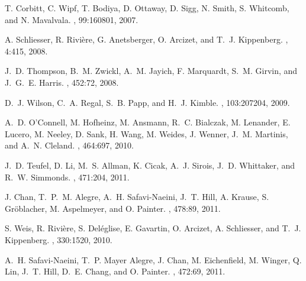 \begin{thebibliography}{1}
T. Corbitt,
C. Wipf,
T. Bodiya,
D. Ottaway,
D. Sigg,
N. Smith,
S. Whitcomb,
and N. Mavalvala.
 ,
99:160801, 2007.

A. Schliesser,
R. Rivi\`{e}re,
G. Anetsberger,
O. Arcizet,
and T.~J. Kippenberg.
,
4:415, 2008.

J.~D. Thompson,
B.~M. Zwickl,
A.~M. Jayich,
F. Marquardt,
S.~M. Girvin,
and J.~G.~E. Harris.
 ,
452:72, 2008.

D.~J. Wilson,
C.~A. Regal,
S.~B. Papp,
and H.~J. Kimble.
,
103:207204, 2009.

A.~D. O'Connell,
M. Hofheinz,
M. Ansmann,
R.~C. Bialczak,
M. Lenander,
E. Lucero,
M. Neeley,
D. Sank,
H. Wang,
M. Weides,
J. Wenner,
J.~M. Martinis,
and A.~N. Cleland.
,
464:697, 2010.

J.~D. Teufel,
D. Li,
M.~S. Allman,
K. Cicak,
A.~J. Sirois,
J.~D. Whittaker,
and R.~W. Simmonds.
,
471:204, 2011.

J. Chan,
T.~P.~M. Alegre,
A.~H. Safavi-Naeini,
J.~T. Hill,
A. Krause,
S. Gr\"{o}blacher,
M. Aspelmeyer,
and O. Painter.
,
478:89, 2011.

S. Weis,
R. Rivi\`{e}re,
S. Del\'{e}glise,
E. Gavartin,
O. Arcizet,
A. Schliesser,
and T.~J. Kippenberg.
,
330:1520, 2010.

A.~H. Safavi-Naeini,
T.~P. Mayer Alegre,
J. Chan,
M. Eichenfield,
M. Winger,
Q. Lin,
J.~T. Hill,
D.~E. Chang,
and O. Painter.
,
472:69, 2011.


\end{thebibliography}
